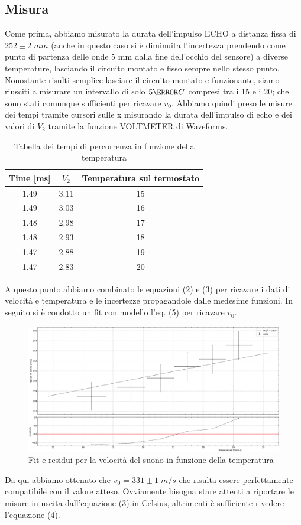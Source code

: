 \documentclass[10pt, a4paper, italian]{article}
\begin{document}
\subsection{Misura}
Come prima, abbiamo misurato la durata dell'impulso ECHO a distanza fissa di $252 \pm 2 \; mm$ (anche in questo caso si è diminuita l'incertezza prendendo come punto di partenza delle onde 5 mm dalla fine dell'occhio del sensore) a diverse temperature, lasciando il circuito montato e fisso sempre nello stesso punto. Nonostante risulti semplice lasciare il circuito montato e funzionante, siamo riusciti a misurare un intervallo di solo $5 \degree C$ compresi tra i 15 e i 20; che sono stati comunque sufficienti per ricavare $v_0$. Abbiamo quindi preso le misure dei tempi tramite cursori sulle x misurando la durata dell'impulso di echo e dei valori di $V_2$ tramite la funzione VOLTMETER di Waveforms.
\begin{table}[H]
\centering
\begin{tabular}{ccc}
\toprule
Time [ms] & $V_2$ & Temperatura sul termostato \\
\midrule
1.49 & 3.11 & 15 \\
1.49 & 3.03 & 16 \\
1.48 & 2.98 & 17 \\
1.48 & 2.93 & 18 \\
1.47 & 2.88 & 19 \\
1.47 & 2.83 & 20
\end{tabular}
\caption{Tabella dei tempi di percorrenza in funzione della temperatura}
\end{table}
A questo punto abbiamo combinato le equazioni (2) e (3) per ricavare i dati di velocità e temperatura e le incertezze propagandole dalle medesime funzioni. In seguito si è condotto un fit con modello l'eq. (5) per ricavare $v_0$.
\begin{figure}[H]
    \centering
	\includegraphics[scale=0.3]{Temperature}
    \caption{Fit e residui per la velocità del suono in funzione della temperatura}
\end{figure}
Da qui abbiamo ottenuto che $v_0 =331 \pm 1 \; m/s$ che risulta essere perfettamente compatibile con il valore atteso. Ovviamente bisogna stare attenti a riportare le misure in uscita dall'equazione (3) in Celsius, altrimenti è sufficiente rivedere l'equazione (4).
\end{document}
